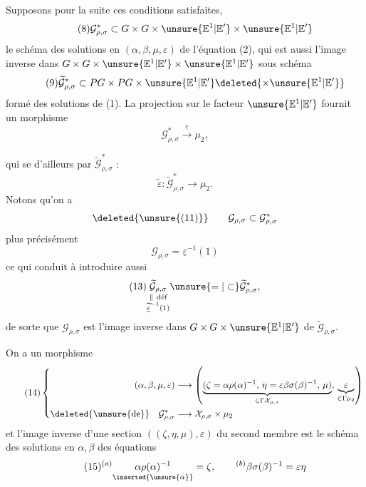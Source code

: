 Supposons pour la suite ces conditions satisfaites,
\[
\tag{8}
\mathcal G^*_{\rho,\sigma}\subset
G\times G\times\unsure{\mathbb E^1|\mathbb E'}
\times\unsure{\mathbb E^1|\mathbb E'}
\]
le schéma des solutions en $(\alpha,\beta,\mu,\varepsilon)$ de l'équation (2),
qui est aussi l'image inverse dans
$G\times G\times\unsure{\mathbb E^1|\mathbb E'}
\times\unsure{\mathbb E^1|\mathbb E'}$  sous schéma
\[
\tag{9}
\widetilde{\mathcal G}^*_{\rho,\sigma}\subset
PG\times PG\times\unsure{\mathbb E^1|\mathbb E'}
\deleted{\times\unsure{\mathbb E^1|\mathbb E'}}
\]
formé des solutions \inserted{$(\alpha,\beta,\mu)$} de (1).
La projection sur le  facteur
$\unsure{\mathbb E^1|\mathbb E'}$ fournit un morphisme
\[
\tag{10}
\mathcal G^*_{\rho,\sigma}\xrightarrow{\underline{\varepsilon}}\mu_2,
\]

qui se  d'ailleurs par $\widetilde{\mathcal G}^{*}_{\rho,\sigma}$ :
\[
\tag{11}
\widetilde{\varepsilon}:\widetilde{\mathcal G}^{*}_{\rho,\sigma}\longrightarrow\mu_2.
\]
Notons qu'on a
\[
\deleted{\unsure{(11)}}\qquad
\mathcal G_{\rho,\sigma}\subset\mathcal G^{*}_{\rho,\sigma}
\]
plus précisément
\[
\tag{12}
\mathcal G_{\rho,\sigma}=\underline{\varepsilon}^{-1}(1)
\]
ce qui conduit à introduire aussi
\[
\tag{13}
\underset{\substack{\Vert\ \text{déf}\\
\underline{\widetilde{\varepsilon}}^{-1}(1)}}{\widetilde{\mathcal G}_{\rho,\sigma}}
\unsure{=|\subset}\widetilde{\mathcal G}^{*}_{\rho,\sigma},
\]
de sorte que $\mathcal G_{\rho,\sigma}$ est l'image inverse dans
$G\times G\times\unsure{\mathbb E^1|\mathbb E'}$ de $\widetilde{\mathcal G}_{\rho,\sigma}$.

On a un morphisme
\[
\tag{14}
\left\{\begin{aligned}
(\alpha,\beta,\mu,\varepsilon)&\longrightarrow
\left(\underbrace{(\zeta=\alpha\rho(\alpha)^{-1},\,
\eta=\varepsilon\beta\sigma(\beta)^{-1},\,\mu)}_{\in\Gamma\mathcal X_{\rho,\sigma}},\,
\underbrace{\varepsilon}_{\in\Gamma\mu_2}\right)\\
\text{\deleted{\unsure{de}}}\quad\mathcal G^{*}_{\rho,\sigma}&\longrightarrow\mathcal X_{\rho,\sigma}\times\mu_2
\end{aligned}\right.
\]
et l'image inverse d'une section $((\zeta,\eta,\mu),\varepsilon)$ du second membre est le
schéma des solutions en $\alpha,\beta$ des équations
\[
\tag{15}
{}^{(a)}\underset{\inserted{\unsure{\alpha}}}{\alpha\rho(\alpha)^{-1}}=\zeta,
\qquad {}^{(b)}\beta\sigma(\beta)^{-1}=\varepsilon\eta
\]


